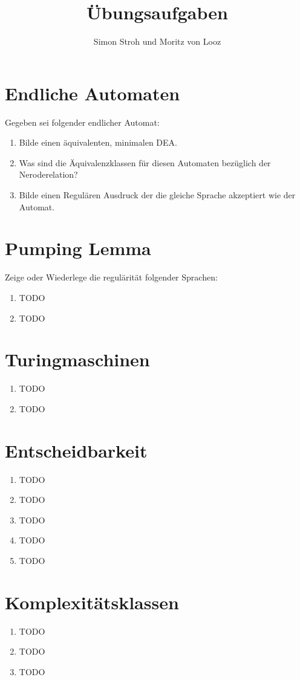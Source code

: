 \documentclass{article}
\begin{document}
\title{Übungsaufgaben}
\author{Simon Stroh und Moritz von Looz}
\maketitle
\section{Endliche Automaten}
Gegeben sei folgender endlicher Automat:
\begin{figure}[H]
\end{figure}
\begin{enumerate}
\item Bilde einen äquivalenten, minimalen DEA.
\item Was sind die Äquivalenzklassen für diesen Automaten bezüglich der Neroderelation?
\item Bilde einen Regulären Ausdruck der die gleiche Sprache akzeptiert wie der Automat.
\end{enumerate}
\section{Pumping Lemma}
Zeige oder Wiederlege die regulärität folgender Sprachen:
\begin{enumerate}
\item TODO 
\item TODO
\end{enumerate}
\section{Turingmaschinen}
\begin{enumerate}
\item TODO %
\item TODO %
\end{enumerate}
\section{Entscheidbarkeit}
\begin{enumerate}
\item TODO %
\item TODO %
\item TODO %
\item TODO %
\item TODO %
\end{enumerate}
\section{Komplexitätsklassen}
\begin{enumerate}
\item TODO %
\item TODO %
\item TODO %
\end{enumerate}
\end{document}
